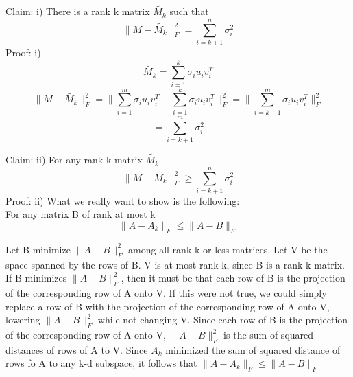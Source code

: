 \begin{Parts}
\begin{solution}
Claim: i) There is a rank k matrix 
$\tilde{M_k}$ such that $$\| M-\tilde{M_k} \|_F^2 = \sum_{i=k+1}^n \sigma_i^2$$
Proof: i)
$$\tilde{M_k} = \sum_{i=1}^k \sigma_i u_i v_i^T $$
$$\|M-\tilde{M_k}\|_F^2 = \|\sum_{i=1}^m \sigma_i u_i v_i^T - \sum_{i=1}^k \sigma_i u_i v_i^T \|_F^2 = \|\sum_{i=k+1}^m \sigma_i u_i v_i^T\|_F^2 $$
$$ = \sum_{i=k+1}^m \sigma_i^2$$

Claim: ii) For any rank k matrix
$\tilde{M_k}$ 
$$\| M-\tilde{M_k} \|_F^2 \geq \sum_{i=k+1}^n \sigma_i^2$$
Proof: ii) What we really want to show is the following:
\\For any matrix B of rank at most k
$$ \|A-A_k \|_F \leq \| A - B \|_F $$

Let B minimize $\| A - B \|_F^2$ among all rank k or less matrices. Let V be the space spanned by the rows of B. V is at most rank k, since B is a rank k matrix. If B minimizes $\| A - B \|_F^2$, then it must be that each row of B is the projection of the corresponding row of A onto V. If this were not true, we could simply replace a row of B with the projection of the corresponding row of A onto V, lowering $ \| A - B \|_F^2$ while not changing V. Since each row of B is the projection of the corresponding row of A onto V, $\| A-B \|_F^2$ is the sum of squared distances of rows of A to V. Since $A_k$ minimized the sum of squared distance of rows fo A to any k-d subspace, it follows that $\| A-A_k \|_F \leq \|A - B \|_F$
\end{solution}
\end{Parts}

\newpage